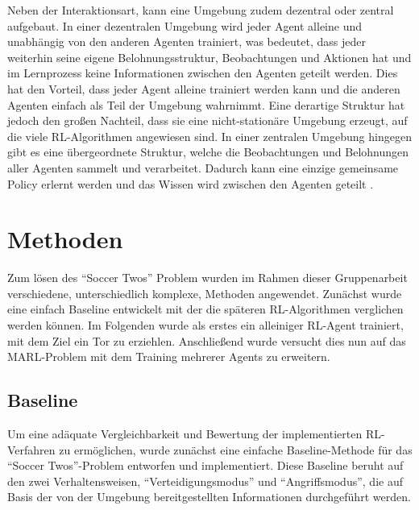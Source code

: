 \documentclass[twocolumn]{webofc}
\begin{document}
Neben der Interaktionsart, kann eine Umgebung zudem dezentral oder zentral aufgebaut. In einer dezentralen Umgebung wird jeder Agent alleine und unabhängig von den anderen Agenten trainiert, was bedeutet, dass jeder weiterhin seine eigene Belohnungsstruktur, Beobachtungen und Aktionen hat und im Lernprozess keine Informationen zwischen den Agenten geteilt werden. Dies hat den Vorteil, dass jeder Agent alleine trainiert werden kann und die anderen Agenten einfach als Teil der Umgebung wahrnimmt. Eine derartige Struktur hat jedoch den großen Nachteil, dass sie eine nicht-stationäre Umgebung erzeugt, auf die viele \ac{RL}-Algorithmen angewiesen sind.
In einer zentralen Umgebung hingegen gibt es eine übergeordnete Struktur, welche die Beobachtungen und Belohnungen aller Agenten sammelt und verarbeitet. Dadurch kann eine einzige gemeinsame Policy erlernt werden und das Wissen wird zwischen den Agenten geteilt \cite{Tan:1993}. %



\section{Methoden} \label{sec-1}

Zum lösen des \enquote{Soccer Twos} Problem wurden im Rahmen dieser Gruppenarbeit verschiedene, unterschiedlich komplexe, Methoden angewendet. Zunächst wurde eine einfach Baseline entwickelt mit der die späteren \ac{RL}-Algorithmen verglichen werden können. Im Folgenden wurde als erstes ein alleiniger \ac{RL}-Agent trainiert, mit dem Ziel ein Tor zu erziehlen. Anschließend wurde versucht dies nun auf das \ac{MARL}-Problem mit dem Training mehrerer Agents zu erweitern.

\subsection{Baseline}

Um eine adäquate Vergleichbarkeit und Bewertung der implementierten \ac{RL}-Verfahren zu ermöglichen, wurde zunächst eine einfache Baseline-Methode für das \enquote{Soccer Twos}-Problem entworfen und implementiert. Diese Baseline beruht auf den zwei Verhaltensweisen, \enquote{Verteidigungsmodus} und \enquote{Angriffsmodus}, die auf Basis der von der Umgebung bereitgestellten Informationen durchgeführt werden.
\end{document}
